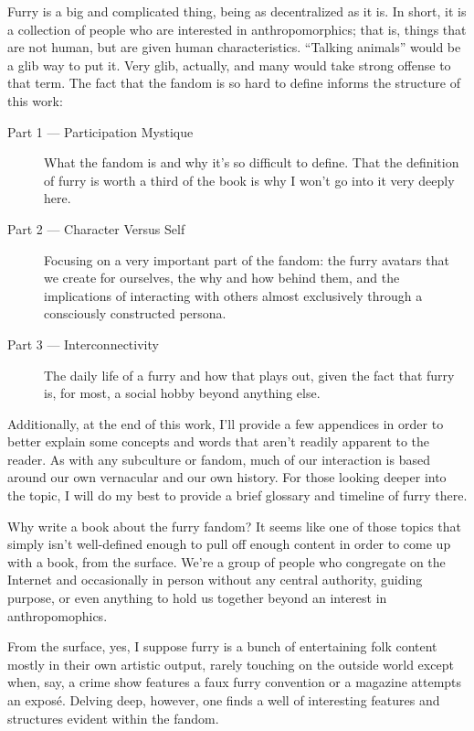 \secdiv

Furry is a big and complicated thing, being as decentralized as it is. In short, it is a collection of people who are interested in anthropomorphics; that is, things that are not human, but are given human characteristics. ``Talking animals'' would be a glib way to put it. Very glib, actually, and many would take strong offense to that term. The fact that the fandom is so hard to define informs the structure of this work:

\begin{description}
\item[Part 1 --- Participation Mystique]
What the fandom is and why it's so difficult to define. That the definition of furry is worth a third of the book is why I won't go into it very deeply here.
\item[Part 2 --- Character Versus Self]
Focusing on a very important part of the fandom: the furry avatars that we create for ourselves, the why and how behind them, and the implications of interacting with others almost exclusively through a consciously constructed persona.
\item[Part 3 --- Interconnectivity]
The daily life of a furry and how that plays out, given the fact that furry is, for most, a social hobby beyond anything else.
\end{description}

Additionally, at the end of this work, I'll provide a few appendices in order to better explain some concepts and words that aren't readily apparent to the reader. As with any subculture or fandom, much of our interaction is based around our own vernacular and our own history. For those looking deeper into the topic, I will do my best to provide a brief glossary and timeline of furry there.

\secdiv

Why write a book about the furry fandom? It seems like one of those topics that simply isn't well-defined enough to pull off enough content in order to come up with a book, from the surface. We're a group of people who congregate on the Internet and occasionally in person without any central authority, guiding purpose, or even anything to hold us together beyond an interest in anthropomophics.

From the surface, yes, I suppose furry is a bunch of entertaining folk content mostly in their own artistic output, rarely touching on the outside world except when, say, a crime show features a faux furry convention or a magazine attempts an exposé. Delving deep, however, one finds a well of interesting features and structures evident within the fandom.

